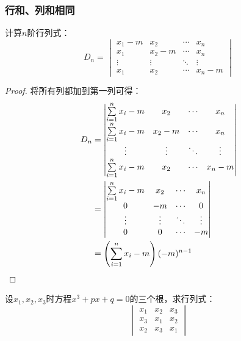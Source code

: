 \subsubsection{行和、列和相同}
\begin{theorem}
	计算$n$阶行列式：
	\begin{equation*}
		D_n=
		\begin{vmatrix}
			x_1-m & x_2 & \cdots & x_n \\
			x_1 & x_2-m & \cdots & x_n \\
			\vdots & \vdots & \ddots & \vdots \\
			x_1 & x_2 & \cdots & x_n-m
		\end{vmatrix}
	\end{equation*}
\end{theorem}
\begin{proof}
	将所有列都加到第一列可得：
	\begin{align*}
		D_n
		&=
		\begin{vmatrix}
			\sum\limits_{i=1}^{n}x_i-m & x_2 & \cdots & x_n \\
			\sum\limits_{i=1}^{n}x_i-m & x_2-m & \cdots & x_n \\
			\vdots & \vdots & \ddots & \vdots \\
			\sum\limits_{i=1}^{n}x_i-m & x_2 & \cdots & x_n-m
		\end{vmatrix} \\
		&=
		\begin{vmatrix}
			\sum\limits_{i=1}^{n}x_i-m & x_2 & \cdots & x_n \\
			0 & -m & \cdots & 0 \\
			\vdots & \vdots & \ddots & \vdots \\
			0 & 0 & \cdots & -m
		\end{vmatrix} \\
		&=\left(\sum_{i=1}^{n}x_i-m\right)(-m)^{n-1}\qedhere
	\end{align*}
\end{proof}
\begin{theorem}
	设$x_1,x_2,x_3$时方程$x^3+px+q=0$的三个根，求行列式：
	\begin{equation*}
		\begin{vmatrix}
			x_1 & x_2 & x_3 \\
			x_3 & x_1 & x_2 \\
			x_2 & x_3 & x_1
		\end{vmatrix}
	\end{equation*}
\end{theorem}

